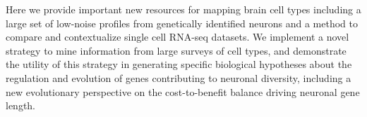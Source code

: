 Here we provide important new resources for mapping brain cell types including a large set of low-noise profiles from genetically identified neurons and a method to compare and contextualize single cell RNA-seq datasets. We implement a novel strategy to mine information from large surveys of cell types, and demonstrate the utility of this strategy in generating specific biological hypotheses about the regulation and evolution of genes contributing to neuronal diversity, including a new evolutionary perspective on the cost-to-benefit balance driving neuronal gene length.









